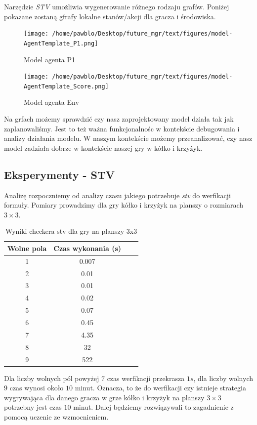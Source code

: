 Narzędzie \textit{STV} umożliwia wygenerowanie różnego rodzaju grafów. Poniżej pokazane zostaną 
gfrafy lokalne stanów/akcji dla gracza i środowiska.
\begin{figure}[h]
  \centering
  \texttt{[image: /home/pawblo/Desktop/future\_mgr/text/figures/model-AgentTemplate\_P1.png]}
  \caption{Model agenta P1}
  \label{fig:enter-label}
\end{figure}

\begin{figure}[h]
  \centering
  \texttt{[image: /home/pawblo/Desktop/future\_mgr/text/figures/model-AgentTemplate\_Score.png]}
  \caption{Model agenta Env}
  \label{fig:enter-label}
\end{figure}


Na grfach możemy sprawdzić czy nasz zaprojektowany model działa tak jak zaplanowaliśmy. Jest to też ważna
funkcjonalnośc w kontekście debugowania i analizy działania modelu. W naszym kontekście możemy przeanalizować, 
czy nasz model zadziała dobrze w kontekście naszej gry w kółko i krzyżyk.



\subsection*{Eksperymenty - STV}
Analizę rozpoczniemy od analizy czasu jakiego potrzebuje \textit{stv} do werfikacji formuły. Pomiary prowadzimy dla gry kółko i krzyżyk 
na planszy o rozmiarach $3 \times 3$.
\begin{table}[h!]
  \centering
  \begin{tabular}{|c|c|c|c|}
  \hline
  Wolne pola & Czas wykonania (s)  \\
  \hline
  1 & 0.007 \\
  2 & 0.01 \\
  3 & 0.01 \\
  4 & 0.02 \\
  5 & 0.07 \\
  6 & 0.45 \\
  7 & 4.35 \\
  8 & 32 \\
  9 & 522\\
  \hline
  \end{tabular}
  \caption{Wyniki checkera stv dla gry na planszy 3x3}
  \label{table:mcmas_results}
  \end{table}
  Dla liczby wolnych pól powyżej $7$ czas werfikacji przekrasza $1s$, dla liczby wolnych $9$ czas wynosi około $10$ minut. Oznacza, to że do werfikacji czy istnieje strategia 
  wygrywająca dla danego gracza w grze kółko i krzyżyk na planszy $3 \times 3$ potrzebny jest czas $10$ minut. 
  Dalej będziemy rozwiązywali to zagadnienie z pomocą uczenie ze wzmocnieniem.

